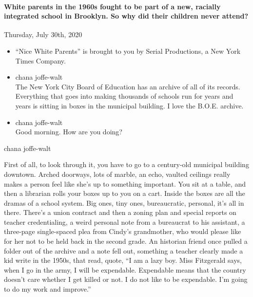\hypertarget{white-parents-in-the-1960s-fought-to-be-part-of-a-new-racially-integrated-school-in-brooklyn-so-why-did-their-children-never-attend}{%
\paragraph{White parents in the 1960s fought to be part of a new,
racially integrated school in Brooklyn. So why did their children never
attend?}\label{white-parents-in-the-1960s-fought-to-be-part-of-a-new-racially-integrated-school-in-brooklyn-so-why-did-their-children-never-attend}}

Thursday, July 30th, 2020

\begin{itemize}
\item
  ``Nice White Parents'' is brought to you by Serial Productions, a New
  York Times Company.
\item
  chana joffe-walt\\
  The New York City Board of Education has an archive of all of its
  records. Everything that goes into making thousands of schools run for
  years and years is sitting in boxes in the municipal building. I love
  the B.O.E. archive.
\item
  chana joffe-walt\\
  Good morning. How are you doing?
\end{itemize}

chana joffe-walt

First of all, to look through it, you have to go to a century-old
municipal building downtown. Arched doorways, lots of marble, an echo,
vaulted ceilings really makes a person feel like she's up to something
important. You sit at a table, and then a librarian rolls your boxes up
to you on a cart. Inside the boxes are all the dramas of a school
system. Big ones, tiny ones, bureaucratic, personal, it's all in there.
There's a union contract and then a zoning plan and special reports on
teacher credentialing, a weird personal note from a bureaucrat to his
assistant, a three-page single-spaced plea from Cindy's grandmother, who
would please like for her not to be held back in the second grade. An
historian friend once pulled a folder out of the archive and a note fell
out, something a teacher clearly made a kid write in the 1950s, that
read, quote, ``I am a lazy boy. Miss Fitzgerald says, when I go in the
army, I will be expendable. Expendable means that the country doesn't
care whether I get killed or not. I do not like to be expendable. I'm
going to do my work and improve.''

